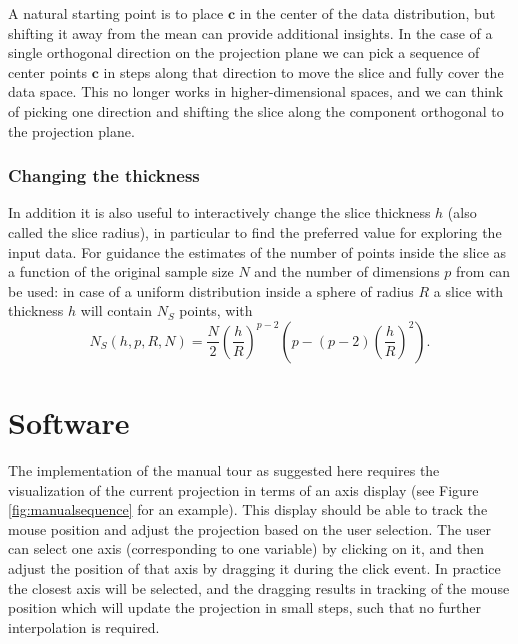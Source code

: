 \documentclass[]{interact}
\theoremstyle{plain}%
\theoremstyle{definition}
\theoremstyle{remark}
\begin{document}
A natural starting point is to place \(\mathbf{c}\) in the center of the
data distribution, but shifting it away from the mean can provide
additional insights. In the case of a single orthogonal direction on the
projection plane we can pick a sequence of center points \(\mathbf{c}\)
in steps along that direction to move the slice and fully cover the data
space. This no longer works in higher-dimensional spaces, and we can
think of picking one direction and shifting the slice along the
component orthogonal to the projection plane.

\hypertarget{changing-the-thickness}{%
\subsubsection{Changing the thickness}\label{changing-the-thickness}}

In addition it is also useful to interactively change the slice
thickness \(h\) (also called the slice radius), in particular to find
the preferred value for exploring the input data. For guidance the
estimates of the number of points inside the slice as a function of the
original sample size \(N\) and the number of dimensions \(p\) from
\citet{sectionpursuit} can be used: in case of a uniform distribution
inside a sphere of radius \(R\) a slice with thickness \(h\) will
contain \(N_S\) points, with \begin{equation}
N_S(h, p, R, N) = \frac{N}{2} \left(\frac{h}{R}\right)^{p-2} \left(p - (p-2)\left(\frac{h}{R}\right)^{2}\right).
\label{eq:count}
\end{equation}

\hypertarget{sec:implementation}{%
\section{Software}\label{sec:implementation}}

The implementation of the manual tour as suggested here requires the
visualization of the current projection in terms of an axis display (see
Figure \ref{fig:manualsequence} for an example). This display should be
able to track the mouse position and adjust the projection based on the
user selection. The user can select one axis (corresponding to one
variable) by clicking on it, and then adjust the position of that axis
by dragging it during the click event. In practice the closest axis will
be selected, and the dragging results in tracking of the mouse position
which will update the projection in small steps, such that no further
interpolation is required.
\end{document}
